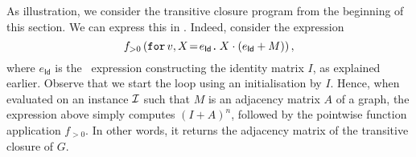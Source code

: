 As illustration, we consider the transitive closure program from the beginning of this section. We can
express this in \langfor. Indeed, consider the expression 
$$
f_{>0}\left(\initf{e_{\mathsf{Id}}}{v}{X}{X\cdot (e_{\mathsf{Id}}+M)}\right),
$$
where $e_{\mathsf{Id}}$ is the \langfor\ expression constructing the identity matrix $I$, as explained earlier.
Observe that we start the loop using an initialisation by $I$. Hence, when evaluated on an instance $\I$ such that $M$ is an adjacency matrix $A$ of a graph, the expression above simply computes $(I+A)^n$, followed by the pointwise function application $f_{>0}$. In other words, it returns the adjacency matrix of the transitive closure of $G$.
%



